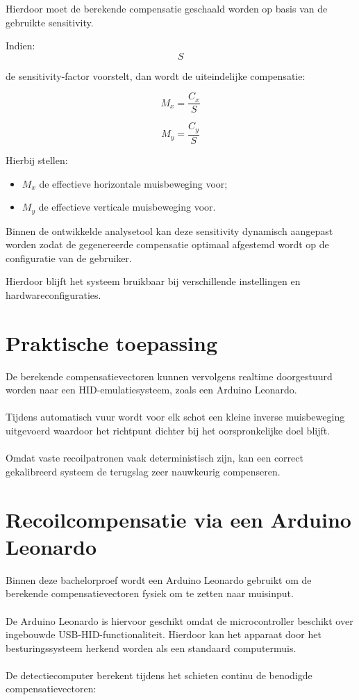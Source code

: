 Hierdoor moet de berekende compensatie geschaald worden op basis van de gebruikte sensitivity.

Indien:
\[
S
\]

de sensitivity-factor voorstelt, dan wordt de uiteindelijke compensatie:

\[
M_x = \frac{C_x}{S}
\]

\[
M_y = \frac{C_y}{S}
\]

Hierbij stellen:
\begin{itemize}
    \item \(M_x\) de effectieve horizontale muisbeweging voor;
    \item \(M_y\) de effectieve verticale muisbeweging voor.
\end{itemize}

Binnen de ontwikkelde analysetool kan deze sensitivity dynamisch aangepast worden zodat de gegenereerde compensatie optimaal afgestemd wordt op de configuratie van de gebruiker.

Hierdoor blijft het systeem bruikbaar bij verschillende instellingen en hardwareconfiguraties.

\section{Praktische toepassing}

De berekende compensatievectoren kunnen vervolgens realtime doorgestuurd worden naar een HID-emulatiesysteem, zoals een Arduino Leonardo.
\\\\
Tijdens automatisch vuur wordt voor elk schot een kleine inverse muisbeweging uitgevoerd waardoor het richtpunt dichter bij het oorspronkelijke doel blijft.
\\\\
Omdat vaste recoilpatronen vaak deterministisch zijn, kan een correct gekalibreerd systeem de terugslag zeer nauwkeurig compenseren.

\section{Recoilcompensatie via een Arduino Leonardo}

Binnen deze bachelorproef wordt een Arduino Leonardo gebruikt om de berekende compensatievectoren fysiek om te zetten naar muisinput.
\\\\
De Arduino Leonardo is hiervoor geschikt omdat de microcontroller beschikt over ingebouwde USB-HID-functionaliteit. Hierdoor kan het apparaat door het besturingssysteem herkend worden als een standaard computermuis.
\\\\
De detectiecomputer berekent tijdens het schieten continu de benodigde compensatievectoren:

